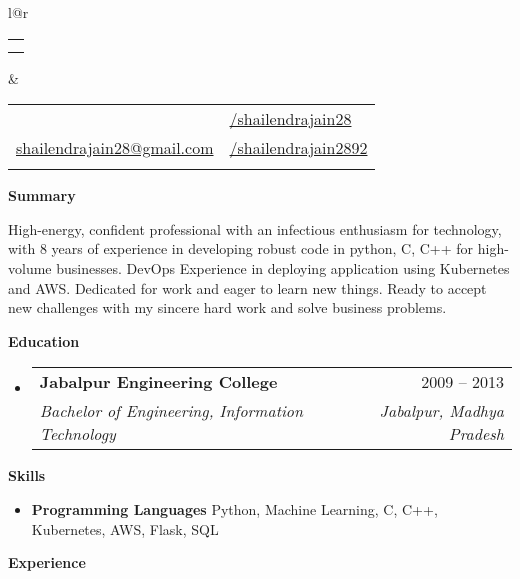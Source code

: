 \documentclass[letterpaper,12pt]{article}[leftmargin=*]
\makeatletter
\def \fullname {Shailendra Jain}
\def \subtitle {}
\def \linkedinicon {\faLinkedin}
\def \linkedinlink {https://www.linkedin.com/in/shailendrajain28/}
\def \linkedintext {/shailendrajain28}
\def \phoneicon {\faPhone}
\def \phonetext {+91-9967219623}
\def \emailicon {\faEnvelope}
\def \emaillink {mailto:shailendrajain28@gmail.com}
\def \emailtext {shailendrajain28@gmail.com}
\def \githubicon {\faGithub}
\def \githublink {https://github.com/shailendrajain2892}
\def \githubtext {/shailendrajain2892}
\def \headertype {\doublecol} %
\def \entryspacing {-0pt}
\def \linkedin {\linkedinicon \hspace{3pt}\href{\linkedinlink}{\linkedintext}}
\def \phone {\phoneicon \hspace{3pt}{ \phonetext}}
\def \email {\emailicon \hspace{3pt}\href{\emaillink}{\emailtext}}
\def \github {\githubicon \hspace{3pt}\href{\githublink}{\githubtext}}
\def \website {\websiteicon \hspace{3pt}\href{\websitelink}{\websitetext}}
\renewcommand{\section}[2]{\vspace{5pt}
  \colorbox{secondary}{\color{white}\raggedbottom\normalsize\textbf{{#1}{\hspace{7pt}#2}}}
}
\newcommand{\resumeEntryStart}{\begin{itemize}[leftmargin=2.5mm]}
\newcommand{\resumeEntryEnd}{\end{itemize}\vspace{\entryspacing}}
\newcommand{\resumeEntryTSDL}[4]{
  \vspace{-1pt}\item[]
    \begin{tabular*}{0.97\textwidth}{l@{\extracolsep{\fill}}r}
      \textbf{\color{primary}#1} & {\firabook\color{accent}\small#2} \\
      \textit{\color{accent}\small#3} & \textit{\color{accent}\small#4} \\
    \end{tabular*}\vspace{-6pt}
}
\newcommand{\resumeEntryS}[2]{
  \item[]\small{
    \textbf{\color{primary}#1 }{ #2 \vspace{-6pt}}
  }
}
\newcommand{\doublecol}[6]{
  \begin{tabular*}{\textwidth}{l@{\extracolsep{\fill}}r}
    {
      \begin{tabular}[c]{l}
        \fontsize{35}{45}\selectfont{\color{primary}{{\textbf{\fullname}}}} \\
        {\textit{\subtitle}} %
      \end{tabular}
    } & {
      \begin{tabular}[c]{l@{\hspace{1.5em}}l}
        {\small#4} & {\small#1} \\
        {\small#5} & {\small#2} \\
        {\small#6} & {\small#3}
      \end{tabular}
    }
  \end{tabular*}
}
\newcommand{\singlecol}[6]{
  \begin{tabular*}{\textwidth}{l@{\extracolsep{\fill}}r}
    {
      \begin{tabular}[b]{l}
        \fontsize{35}{45}\selectfont{\color{primary}{{\textbf{\fullname}}}} \\
        {\textit{\subtitle}} %
      \end{tabular}
    } & {
      \begin{tabular}[c]{l}
        {\small#1} \\
        {\small#2} \\
        {\small#3} \\
        {\small#4} \\
        {\small#5} \\
        {\small#6}
      \end{tabular}
    }
  \end{tabular*}
}
\makeatother
\begin{document}


\headertype{\linkedin}{\github}{\website}{\phone}{\email}{} %
\vspace{-10pt} %
\section{\faClipboard}{Summary}

  \resumeEntryStart
  \bigbreak
{High-energy, confident professional with an infectious enthusiasm for technology, with 8  years of  experience in developing robust code in python, C, C++ for high-volume businesses. DevOps Experience in deploying application using Kubernetes and AWS. Dedicated for work and eager to learn new things. Ready to accept new challenges with my sincere hard work and solve business problems.}
  \resumeEntryEnd
\section{\faGraduationCap}{Education}

  \resumeEntryStart
    \resumeEntryTSDL
      {Jabalpur Engineering College}{2009 -- 2013}
      {Bachelor of Engineering, Information Technology}{Jabalpur, Madhya Pradesh}
  \resumeEntryEnd
\section{\faGears}{Skills}
 \resumeEntryStart
  \resumeEntryS{Programming Languages } {Python, Machine Learning, C, C++, Kubernetes, AWS, Flask, SQL}
 \resumeEntryEnd
\section{\faPieChart}{Experience}
\end{document}
